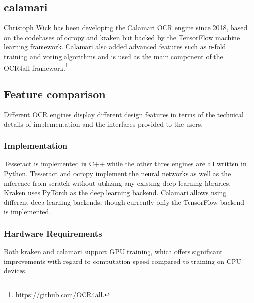\documentclass[sigconf]{acmart}
\begin{document}
\subsection{calamari}

Christoph Wick has been developing the Calamari
\cite{DBLP:journals/corr/abs-1807-02004} OCR engine since 2018, based on the
codebases of ocropy and kraken but backed by the TensorFlow machine learning
framework. Calamari also added advanced features such as n-fold training and
voting algorithms and is used as the main component of the OCR4all
framework.\footnote{\url{https://github.com/OCR4all}.}

\subsection{Feature comparison}


Different OCR engines display different design features in terms of the
technical details of implementation and the interfaces provided to the users.

\subsubsection{Implementation}

Tesseract is implemented in C++ while the
other three engines are all written in Python. Tesseract and ocropy
implement the neural networks as well as the inference from scratch without
utilizing any existing deep learning libraries. Kraken uses PyTorch as the
deep learning backend. Calamari allows using different deep learning backends,
though currently only the TensorFlow backend is implemented.


\subsubsection{Hardware Requirements}

Both kraken and calamari support GPU training, which offers significant
improvements with regard to computation speed compared to training on CPU devices.

\end{document}
